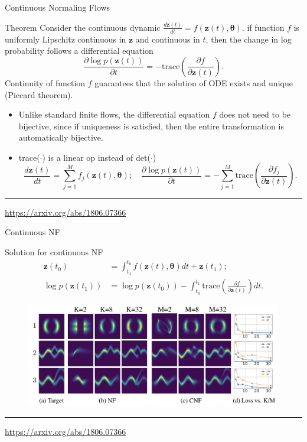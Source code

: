 \documentclass{beamer}
\newcommand{\bz}{\mathbf{z}}
\newcommand{\btheta}{\boldsymbol{\theta}}
\begin{document}
\begin{frame}{Continuous Normaling Flows}
	\begin{block}{Theorem}
		Consider the continuous dynamic $\frac{d\bz(t)}{dt} = f(\bz(t), \btheta)$. if function $f$ is uniformly Lipschitz continuous in $\bz$ and continuous in $t$, then the change in log probability follows a differential equation
		\[
		\frac{\partial \log p(\bz(t))}{\partial t} = - \text{trace} \left( \frac{\partial f}{\partial \bz(t)} \right).
		\]
		\vspace{-0.1cm}
		Continuity of function $f$ guarantees that the solution of ODE exists and unique (Piccard theorem).
	\end{block}
	\begin{itemize}
		\item Unlike standard finite flows, the differential equation $f$ does not need to be bijective, since if
		uniqueness is satisfied, then the entire transformation is automatically bijective.
		\item trace($\cdot$) is a linear op instead of det($\cdot$)
		\vspace{-0.1cm}
		\[
		\frac{d\bz(t)}{dt} = \sum_{j=1}^M f_j(\bz(t), \btheta); \quad \frac{\partial \log p(\bz(t))}{\partial t} = - \sum_{j=1}^M\text{trace} \left( \frac{\partial f_j}{\partial \bz(t)} \right).
		\]
	\end{itemize}
	\vfill
	\hrule\medskip
	{\scriptsize \href{https://arxiv.org/abs/1806.07366}{https://arxiv.org/abs/1806.07366}} 
\end{frame}
\begin{frame}{Continuous NF}
	\begin{block}{Solution for continuous NF}
		\vspace{-0.3cm}
	\begin{align*}
		\bz(t_0) &= \int_{t_1}^{t_0} f(\bz(t), \btheta) dt + \bz(t_1); \\
	    \log p(\bz(t_1)) &= \log p(\bz(t_0)) - \int_{t_0}^{t_1} \text{trace} \left( \frac{\partial f}{\partial \bz(t)} \right) dt.
	\end{align*}
	\end{block}
	\vspace{-0.3cm}
	\begin{figure}
	    \centering
	    \includegraphics[width=1\linewidth]{figs/cnf}
	\end{figure}
	\vfill
	\hrule\medskip
	{\scriptsize \href{https://arxiv.org/abs/1806.07366}{https://arxiv.org/abs/1806.07366}} 
\end{frame}
\end{document}
